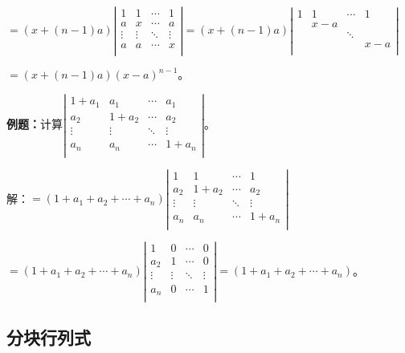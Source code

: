 \documentclass[UTF8, 12pt]{ctexart}
\begin{document}
$=(x+(n-1)a)\left|\begin{array}{cccc} 
    1 & 1 & \cdots & 1 \\
    a & x & \cdots & a \\
    \vdots & \vdots & \ddots & \vdots \\
    a & a & \cdots & x \\
\end{array}\right|=(x+(n-1)a)\left|\begin{array}{cccc} 
    1 & 1 & \cdots & 1 \\
     & x-a & &  \\
     & & \ddots & \\
     & & & x-a \\
\end{array}\right|$

$=(x+(n-1)a)(x-a)^{n-1}$。

\textbf{例题：}计算$\left|\begin{array}{cccc} 
    1+a_1 & a_1 & \cdots & a_1 \\
    a_2 & 1+a_2 & \cdots & a_2 \\
    \vdots & \vdots & \ddots & \vdots \\
    a_n & a_n & \cdots & 1+a_n \\
\end{array}\right|$。

解：$=(1+a_1+a_2+\cdots+a_n)\left|\begin{array}{cccc} 
    1 & 1 & \cdots & 1 \\
    a_2 & 1+a_2 & \cdots & a_2 \\
    \vdots & \vdots & \ddots & \vdots \\
    a_n & a_n & \cdots & 1+a_n \\
\end{array}\right|$

$=(1+a_1+a_2+\cdots+a_n)\left|\begin{array}{cccc} 
    1 & 0 & \cdots & 0 \\
    a_2 & 1 & \cdots & 0 \\
    \vdots & \vdots & \ddots & \vdots \\
    a_n & 0 & \cdots & 1 \\
\end{array}\right|=(1+a_1+a_2+\cdots+a_n)$。

\subsection{分块行列式}
\end{document}
